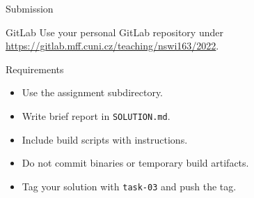 \begin{frame}{Submission}
    \begin{block}{GitLab}
        Use your personal GitLab repository under \\
        \url{https://gitlab.mff.cuni.cz/teaching/nswi163/2022}.
    \end{block}
    \begin{block}{Requirements}
        \begin{itemize}
            \item Use the assignment subdirectory.
            \item Write brief report in \lstinline{SOLUTION.md}.
            \item Include build scripts with instructions.
            \item Do not commit binaries or temporary build artifacts.
            \item Tag your solution with \lstinline{task-03} and push the tag.
        \end{itemize}
    \end{block}
\end{frame}




